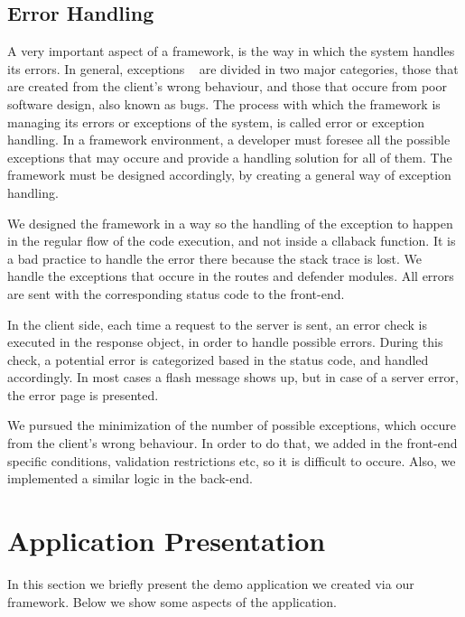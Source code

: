 \subsection{Error Handling}
A very important aspect of a framework, is the way in which the system handles its errors. In general, exceptions ~\cite{carlson2000method} are divided in two major categories, those that are created from the client's wrong behaviour, and those that occure from poor software design, also known as bugs. The process with which the framework is managing its errors or exceptions of the system, is called error or exception handling. In a framework environment, a developer must foresee all the possible exceptions that may occure and provide a handling solution for all of them. The framework must be designed accordingly, by creating a general way of exception handling. \par
	We designed the framework in a way so the handling of the exception to happen in the regular flow of the code execution, and not inside a cllaback function. It is a bad practice to handle the error there because the stack trace is lost. We handle the exceptions that occure in the routes and defender modules. All errors are sent with the corresponding status code to the front-end. \par 
	In the client side, each time a request to the server is sent, an error check is executed in the response object, in order to handle possible errors. During this check, a potential error is categorized based in the status code, and handled accordingly. In most cases a flash message shows up, but in case of a server error, the error page is presented. \par 
	We pursued the minimization of the number of possible exceptions, which occure from the client's wrong behaviour. In order to do that, we added in the front-end specific conditions, validation restrictions etc, so it is difficult to occure. Also, we implemented a similar logic in the back-end.


\section{Application Presentation}
In this section we briefly present the demo application we created via our framework. Below we show some aspects of the application.

